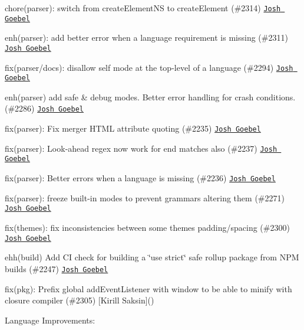 \begin{DoxyItemize}
\item chore(parser)\+: switch from {\ttfamily create\+Element\+NS} to {\ttfamily create\+Element} (\#2314) \href{https://github.com/yyyc514}{\tt Josh Goebel}
\item enh(parser)\+: add better error when a language requirement is missing (\#2311) \href{https://github.com/yyyc514}{\tt Josh Goebel}
\item fix(parser/docs)\+: disallow {\ttfamily self} mode at the top-\/level of a language (\#2294) \href{https://github.com/yyyc514}{\tt Josh Goebel}
\item enh(parser) add safe \& debug modes. Better error handling for crash conditions. (\#2286) \href{https://github.com/yyyc514}{\tt Josh Goebel}
\item fix(parser)\+: Fix merger H\+T\+ML attribute quoting (\#2235) \href{https://github.com/yyyc514}{\tt Josh Goebel}
\item fix(parser)\+: Look-\/ahead regex now work for end matches also (\#2237) \href{https://github.com/yyyc514}{\tt Josh Goebel}
\item fix(parser)\+: Better errors when a language is missing (\#2236) \href{https://github.com/yyyc514}{\tt Josh Goebel}
\item fix(parser)\+: freeze built-\/in modes to prevent grammars altering them (\#2271) \href{https://github.com/yyyc514}{\tt Josh Goebel}
\item fix(themes)\+: fix inconsistencies between some themes padding/spacing (\#2300) \href{https://github.com/yyyc514}{\tt Josh Goebel}
\item ehh(build) Add CI check for building a \char`\"{}use strict\char`\"{} safe rollup package from N\+PM builds (\#2247) \href{https://github.com/yyyc514}{\tt Josh Goebel}
\item fix(pkg)\+: Prefix global add\+Event\+Listener with window to be able to minify with closure compiler (\#2305) \mbox{[}Kirill Saksin\mbox{]}()
\end{DoxyItemize}

Language Improvements\+:


